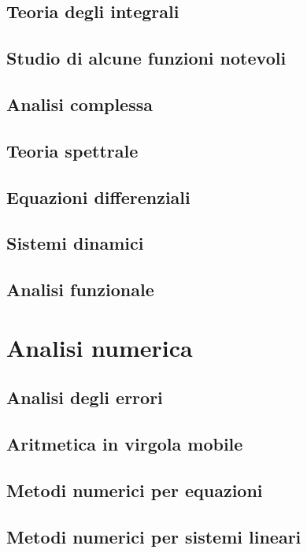 \documentclass{book}
\begin{document}
  \chapter{Teoria degli integrali}
  
	\chapter{Studio di alcune funzioni notevoli}
	
  \chapter{Analisi complessa}
  
  \chapter{Teoria spettrale}
  
  \chapter{Equazioni differenziali}
  
	\chapter{Sistemi dinamici}
	
	\chapter{Analisi funzionale}
	
	\part{Analisi numerica}
  \chapter{Analisi degli errori}
  
	\chapter{Aritmetica in virgola mobile}
	
	\chapter{Metodi numerici per equazioni}
	
	\chapter{Metodi numerici per sistemi lineari}
	
\end{document}
